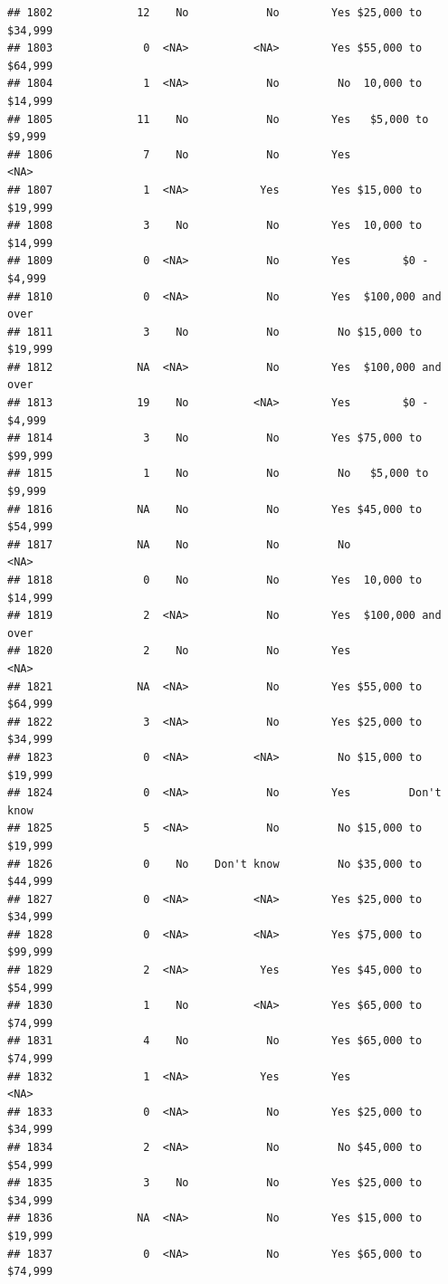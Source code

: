 \documentclass[man]{apa6}
\begin{document}
\begin{verbatim}
## 1802             12    No            No        Yes $25,000 to $34,999
## 1803              0  <NA>          <NA>        Yes $55,000 to $64,999
## 1804              1  <NA>            No         No  10,000 to $14,999
## 1805             11    No            No        Yes   $5,000 to $9,999
## 1806              7    No            No        Yes               <NA>
## 1807              1  <NA>           Yes        Yes $15,000 to $19,999
## 1808              3    No            No        Yes  10,000 to $14,999
## 1809              0  <NA>            No        Yes        $0 - $4,999
## 1810              0  <NA>            No        Yes  $100,000 and over
## 1811              3    No            No         No $15,000 to $19,999
## 1812             NA  <NA>            No        Yes  $100,000 and over
## 1813             19    No          <NA>        Yes        $0 - $4,999
## 1814              3    No            No        Yes $75,000 to $99,999
## 1815              1    No            No         No   $5,000 to $9,999
## 1816             NA    No            No        Yes $45,000 to $54,999
## 1817             NA    No            No         No               <NA>
## 1818              0    No            No        Yes  10,000 to $14,999
## 1819              2  <NA>            No        Yes  $100,000 and over
## 1820              2    No            No        Yes               <NA>
## 1821             NA  <NA>            No        Yes $55,000 to $64,999
## 1822              3  <NA>            No        Yes $25,000 to $34,999
## 1823              0  <NA>          <NA>         No $15,000 to $19,999
## 1824              0  <NA>            No        Yes         Don't know
## 1825              5  <NA>            No         No $15,000 to $19,999
## 1826              0    No    Don't know         No $35,000 to $44,999
## 1827              0  <NA>          <NA>        Yes $25,000 to $34,999
## 1828              0  <NA>          <NA>        Yes $75,000 to $99,999
## 1829              2  <NA>           Yes        Yes $45,000 to $54,999
## 1830              1    No          <NA>        Yes $65,000 to $74,999
## 1831              4    No            No        Yes $65,000 to $74,999
## 1832              1  <NA>           Yes        Yes               <NA>
## 1833              0  <NA>            No        Yes $25,000 to $34,999
## 1834              2  <NA>            No         No $45,000 to $54,999
## 1835              3    No            No        Yes $25,000 to $34,999
## 1836             NA  <NA>            No        Yes $15,000 to $19,999
## 1837              0  <NA>            No        Yes $65,000 to $74,999

\end{verbatim}
\end{document}
